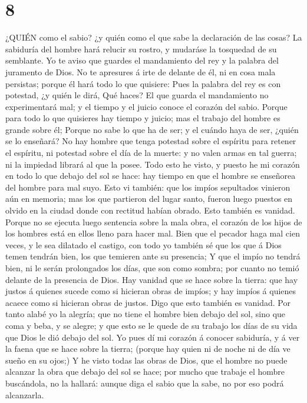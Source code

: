 \hypertarget{section-7}{%
\section{8}\label{section-7}}

 ¿QUIÉN como el sabio? ¿y quién como el que sabe la
declaración de las cosas? La sabiduría del hombre hará relucir su
rostro, y mudaráse la tosquedad de su semblante.  Yo te
aviso que guardes el mandamiento del rey y la palabra del juramento de
Dios.  No te apresures á irte de delante de él, ni en cosa
mala persistas; porque él hará todo lo que quisiere:  Pues
la palabra del rey es con potestad, ¿y quién le dirá, Qué haces?
 El que guarda el mandamiento no experimentará mal; y el
tiempo y el juicio conoce el corazón del sabio.  Porque para
todo lo que quisieres hay tiempo y juicio; mas el trabajo del hombre es
grande sobre él;  Porque no sabe lo que ha de ser; y el
cuándo haya de ser, ¿quién se lo enseñará?  No hay hombre
que tenga potestad sobre el espíritu para retener el espíritu, ni
potestad sobre el día de la muerte: y no valen armas en tal guerra; ni
la impiedad librará al que la posee.  Todo esto he visto, y
puesto he mi corazón en todo lo que debajo del sol se hace: hay tiempo
en que el hombre se enseñorea del hombre para mal suyo. 
Esto vi también: que los impíos sepultados vinieron aún en memoria; mas
los que partieron del lugar santo, fueron luego puestos en olvido en la
ciudad donde con rectitud habían obrado. Esto también es vanidad.
 Porque no se ejecuta luego sentencia sobre la mala obra,
el corazón de los hijos de los hombres está en ellos lleno para hacer
mal.  Bien que el pecador haga mal cien veces, y le sea
dilatado el castigo, con todo yo también sé que los que á Dios temen
tendrán bien, los que temieren ante su presencia;  Y que el
impío no tendrá bien, ni le serán prolongados los días, que son como
sombra; por cuanto no temió delante de la presencia de Dios.
 Hay vanidad que se hace sobre la tierra: que hay justos á
quienes sucede como si hicieran obras de impíos; y hay impíos á quienes
acaece como si hicieran obras de justos. Digo que esto también es
vanidad.  Por tanto alabé yo la alegría; que no tiene el
hombre bien debajo del sol, sino que coma y beba, y se alegre; y que
esto se le quede de su trabajo los días de su vida que Dios le dió
debajo del sol.  Yo pues dí mi corazón á conocer sabiduría,
y á ver la faena que se hace sobre la tierra; (porque hay quien ni de
noche ni de día ve sueño en su ojos;)  Y he visto todas las
obras de Dios, que el hombre no puede alcanzar la obra que debajo del
sol se hace; por mucho que trabaje el hombre buscándola, no la hallará:
aunque diga el sabio que la sabe, no por eso podrá alcanzarla.

